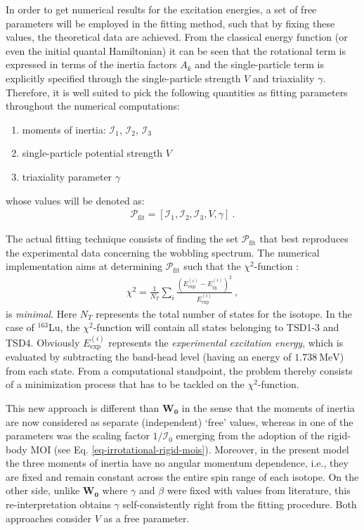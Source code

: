 In order to get numerical results for the excitation energies, a set of free parameters will be employed in the fitting method, such that by fixing these values, the theoretical data are achieved. From the classical energy function (or even the initial quantal Hamiltonian) it can be seen that the rotational term is expressed in terms of the inertia factors $A_k$ and the single-particle term is explicitly specified through the single-particle strength $V$ and triaxiality $\gamma$. Therefore, it is well suited to pick the following quantities as fitting parameters throughout the numerical computations:
\begin{enumerate}
    \item moments of inertia: $\mathcal{I}_1$, $\mathcal{I}_2$, $\mathcal{I}_3$
    \item single-particle potential strength $V$
    \item triaxiality parameter $\gamma$
\end{enumerate}
whose values will be denoted as:
\begin{align}
    \mathcal{P}_\text{fit}=\left[\mathcal{I}_1,\mathcal{I}_2,\mathcal{I}_3,V,\gamma\right]\ .
    \label{fitting-parameters-p-fit}
\end{align}

The actual fitting technique consists of finding the set $\mathcal{P}_\text{fit}$ that best reproduces the experimental data concerning the wobbling spectrum. The numerical implementation aims at determining $\mathcal{P}_\text{fit}$ such that the $\chi^2$-function \cite{poenaru2021extensive1} :
\begin{align}
    \chi^2=\frac{1}{N_T}\sum_i\frac{\left(E_\text{exp}^{(i)}-E_\text{th}^{(i)}\right)^2}{E_\text{exp}^{(i)}}\ ,
    \label{chi-2-fitting-function}
\end{align}
is \emph{minimal}. Here $N_T$ represents the total number of states for the isotope. In the case of $^{163}$Lu, the $\chi^2$-function will contain all states belonging to TSD1-3 and TSD4. Obviously $E_\text{exp}^{(i)}$ represents the \emph{experimental excitation energy}, which is evaluated by subtracting the band-head level (having an energy of $1.738\ \text{MeV}$) from each state. From a computational standpoint, the problem thereby consists of a minimization process that has to be tackled on the $\chi^2$-function.

This new approach is different than $\mathbf{W_0}$ in the sense that the moments of inertia are now considered as separate (independent) `free' values, whereas in \cite{raduta2017semiclassical} one of the parameters was the scaling factor $1/\mathcal{I}_0$ emerging from the adoption of the rigid-body MOI (see Eq. \ref{eq-irrotational-rigid-mois}). Moreover, in the present model the three moments of inertia have no angular momentum dependence, i.e., they are fixed and remain constant across the entire spin range of each isotope. On the other side, unlike $\mathbf{W_0}$ where $\gamma$ and $\beta$ were fixed with values from literature, this re-interpretation obtains $\gamma$ self-consistently right from the fitting procedure. Both approaches consider $V$ as a free parameter.

